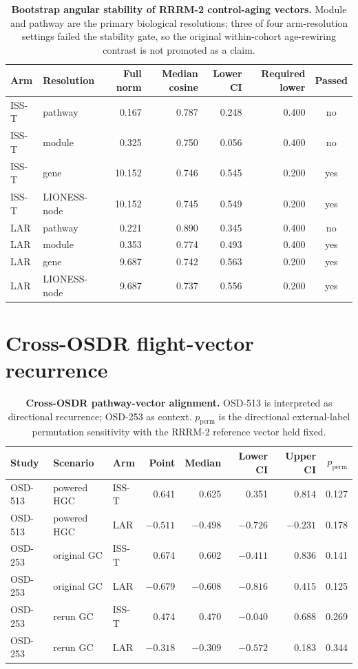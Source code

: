 \documentclass[10pt]{article}
\begin{document}
\begin{table}[H]
\centering\small
\caption{\textbf{Bootstrap angular stability of RRRM-2 control-aging vectors.} Module and pathway are the primary biological resolutions; three of four arm-resolution settings failed the stability gate, so the original within-cohort age-rewiring contrast is not promoted as a claim.}
\label{tab:stab}
\begin{tabular}{llrrrrc}
\toprule
Arm & Resolution & Full norm & Median cosine & Lower CI & Required lower & Passed \\
\midrule
ISS-T & pathway & 0.167 & 0.787 & 0.248 & 0.400 & no \\
ISS-T & module & 0.325 & 0.750 & 0.056 & 0.400 & no \\
ISS-T & gene & 10.152 & 0.746 & 0.545 & 0.200 & yes \\
ISS-T & LIONESS-node & 10.152 & 0.745 & 0.549 & 0.200 & yes \\
LAR & pathway & 0.221 & 0.890 & 0.345 & 0.400 & no \\
LAR & module & 0.353 & 0.774 & 0.493 & 0.400 & yes \\
LAR & gene & 9.687 & 0.742 & 0.563 & 0.200 & yes \\
LAR & LIONESS-node & 9.687 & 0.737 & 0.556 & 0.200 & yes \\
\bottomrule
\end{tabular}
\end{table}

\section{Cross-OSDR flight-vector recurrence}

\begin{table}[H]
\centering\small
\caption{\textbf{Cross-OSDR pathway-vector alignment.} OSD-513 is interpreted as directional recurrence; OSD-253 as context. $p_{\mathrm{perm}}$ is the directional external-label permutation sensitivity with the RRRM-2 reference vector held fixed.}
\label{tab:cross}
\begin{tabular}{lllrrrrr}
\toprule
Study & Scenario & Arm & Point & Median & Lower CI & Upper CI & $p_{\mathrm{perm}}$ \\
\midrule
OSD-513 & powered HGC & ISS-T & 0.641 & 0.625 & 0.351 & 0.814 & 0.127 \\
OSD-513 & powered HGC & LAR & $-0.511$ & $-0.498$ & $-0.726$ & $-0.231$ & 0.178 \\
OSD-253 & original GC & ISS-T & 0.674 & 0.602 & $-0.411$ & 0.836 & 0.141 \\
OSD-253 & original GC & LAR & $-0.679$ & $-0.608$ & $-0.816$ & 0.415 & 0.125 \\
OSD-253 & rerun GC & ISS-T & 0.474 & 0.470 & $-0.040$ & 0.688 & 0.269 \\
OSD-253 & rerun GC & LAR & $-0.318$ & $-0.309$ & $-0.572$ & 0.183 & 0.344 \\
\bottomrule
\end{tabular}
\end{table}
\end{document}
